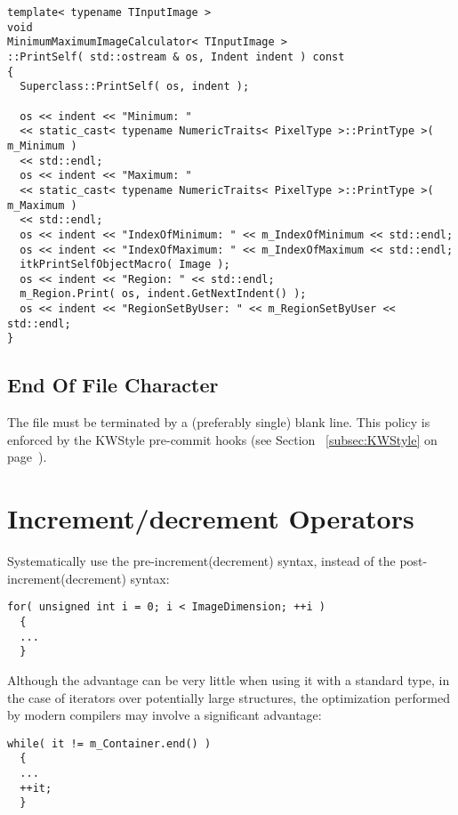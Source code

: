 \small
\begin{verbatim}
template< typename TInputImage >
void
MinimumMaximumImageCalculator< TInputImage >
::PrintSelf( std::ostream & os, Indent indent ) const
{
  Superclass::PrintSelf( os, indent );

  os << indent << "Minimum: "
  << static_cast< typename NumericTraits< PixelType >::PrintType >( m_Minimum )
  << std::endl;
  os << indent << "Maximum: "
  << static_cast< typename NumericTraits< PixelType >::PrintType >( m_Maximum )
  << std::endl;
  os << indent << "IndexOfMinimum: " << m_IndexOfMinimum << std::endl;
  os << indent << "IndexOfMaximum: " << m_IndexOfMaximum << std::endl;
  itkPrintSelfObjectMacro( Image );
  os << indent << "Region: " << std::endl;
  m_Region.Print( os, indent.GetNextIndent() );
  os << indent << "RegionSetByUser: " << m_RegionSetByUser << std::endl;
}
\end{verbatim}
\normalsize


\subsection{End Of File Character}
\label{subsec:EndOfFileCharacter}

The file must be terminated by a (preferably single) blank line.
This policy is enforced by the KWStyle pre-commit hooks (see Section
~\ref{subsec:KWStyle} on page~\pageref{subsec:KWStyle}).


\section{Increment/decrement Operators}
\label{sec:IncrementDecrementOperators}

Systematically use the pre-increment(decrement) syntax, instead of the
post-increment(decrement) syntax:

\small
\begin{verbatim}
for( unsigned int i = 0; i < ImageDimension; ++i )
  {
  ...
  }
\end{verbatim}
\normalsize

Although the advantage can be very little when using it with a standard type,
in the case of iterators over potentially large structures, the optimization
performed by modern compilers may involve a significant advantage:

\small
\begin{verbatim}
while( it != m_Container.end() )
  {
  ...
  ++it;
  }
\end{verbatim}
\normalsize


